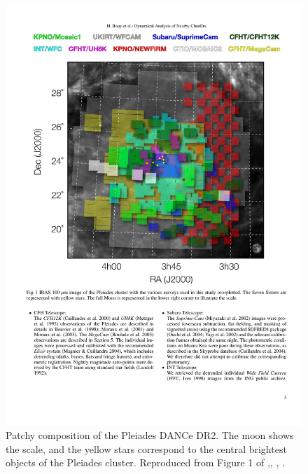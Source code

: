 \begin{figure}[ht!]
\begin{center}
\includegraphics[width=\textwidth]{background/Figures/F1_Bouy2013.pdf}
\caption{Patchy composition of the Pleiades DANCe DR2. The moon shows the scale, and the yellow stars correspond to the central brightest objects of the Pleiades cluster. Reproduced from Figure 1 of \citet{Bouy2013},\textit{}, , .}
\label{fig:originDANCeDR2}
\end{center}
\end{figure}

